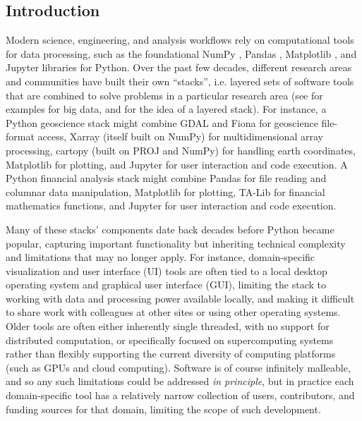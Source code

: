 \subsection{Introduction \label{introduction}}

Modern science, engineering, and analysis workflows rely on computational tools for data processing, such as the foundational NumPy \cite{harris:nature20}, Pandas \cite{mckinney:scipy10}, Matplotlib \cite{hunter:cse07}, and Jupyter \cite{kluyver:ppap16} libraries for Python. Over the past few decades, different research areas and communities have built their own ``stacks'', i.e. layered sets of software tools that are combined to solve problems in a particular research area (see \cite{stancin:mipro19} for examples for big data, and \cite{briscoe:pcna00} for the idea of a layered stack). For instance, a Python geoscience stack might combine GDAL and Fiona for geoscience file-format access, Xarray \cite{hoyer:jors17} (itself built on NumPy) for multidimensional array processing, cartopy (built on PROJ and NumPy) for handling earth coordinates, Matplotlib for plotting, and Jupyter for user interaction and code execution. A Python financial analysis stack might combine Pandas for file reading and columnar data manipulation, Matplotlib for plotting, TA-Lib for financial mathematics functions, and Jupyter for user interaction and code execution.

Many of these stacks' components date back decades before Python became popular, capturing important functionality but inheriting technical complexity and limitations that may no longer apply. For instance, domain-specific visualization and user interface (UI) tools are often tied to a local desktop operating system and graphical user interface (GUI), limiting the stack to working with data and processing power available locally, and making it difficult to share work with colleagues at other sites or using other operating systems. Older tools are often either inherently single threaded, with no support for distributed computation, or specifically focused on supercomputing systems rather than flexibly supporting the current diversity of computing platforms (such as GPUs and cloud computing). Software is of course infinitely malleable, and so any such limitations could be addressed \emph{in principle}, but in practice each domain-specific tool has a relatively narrow collection of users, contributors, and funding sources for that domain, limiting the scope of such development.

